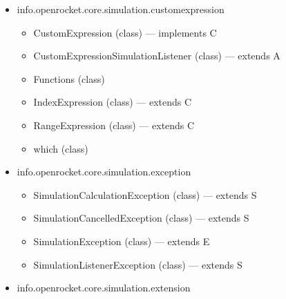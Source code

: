 \documentclass{amsdtx}
\begin{document}
\begin{itemize}
\begin{itemize}
\begin{itemize}
      SimulationStatus (class) --- implements C
    \item
      SimulationStepper (interface)
    \item
      ThrustState (enum)
    \item
      Type (enum)
    \item
      defined (class)
    \item
      defining (class)
    \item
      for (class)
    \item
      for (class)
    \item
      holding (class)
    \item
      that (class)
    \end{itemize}
  \item
    info.openrocket.core.simulation.customexpression

    \begin{itemize}
    
    \item
      CustomExpression (class) --- implements C
    \item
      CustomExpressionSimulationListener (class) --- extends A
    \item
      Functions (class)
    \item
      IndexExpression (class) --- extends C
    \item
      RangeExpression (class) --- extends C
    \item
      which (class)
    \end{itemize}
  \item
    info.openrocket.core.simulation.exception

    \begin{itemize}
    
    \item
      SimulationCalculationException (class) --- extends S
    \item
      SimulationCancelledException (class) --- extends S
    \item
      SimulationException (class) --- extends E
    \item
      SimulationListenerException (class) --- extends S
    \end{itemize}
  \item
    info.openrocket.core.simulation.extension

    \begin{itemize}
    

\end{itemize}
\end{itemize}
\end{itemize}
\end{document}
